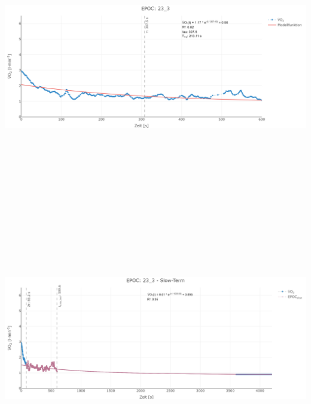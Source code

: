 \documentclass[
  letterpaper,
  DIV=11]{scrartcl}
\begin{document}
\includegraphics[width=11.45833in,height=4.6875in]{images/23_3_tau.png}
\includegraphics[width=11.45833in,height=4.6875in]{images/23_3_slow.png}
\end{document}

